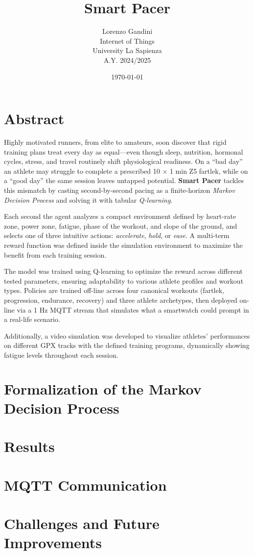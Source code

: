 \documentclass[a4paper,12pt]{article}
\title{Smart Pacer}
\author{Lorenzo Gandini \\ Internet of Things \\ University La Sapienza \\ A.Y. 2024/2025}
\date{\today}
\begin{document}
\maketitle

\newpage

\tableofcontents
\newpage

\section{Abstract}\label{abstract}
Highly motivated runners, from elite to amateurs, soon discover that rigid training plans treat every day as equal—even though sleep, nutrition, hormonal cycles, stress, and travel routinely shift physiological readiness. On a “bad day” an athlete may struggle to complete a prescribed 10 × 1 min Z5 fartlek, while on a “good day” the same session leaves untapped potential.  
\textbf{Smart Pacer} tackles this mismatch by casting second-by-second pacing as a finite-horizon \emph{Markov Decision Process} and solving it with tabular \emph{Q-learning}. 

Each second the agent analyzes a compact environment defined by heart-rate zone, power zone, fatigue, phase of the workout, and slope of the ground, and selects one of three intuitive actions: \emph{accelerate}, \emph{hold}, or \emph{ease}. A multi-term reward function was defined inside the simulation environment to maximize the benefit from each training session.

The model was trained using Q-learning to optimize the reward across different tested parameters, ensuring adaptability to various athlete profiles and workout types. Policies are trained off-line across four canonical workouts (fartlek, progression, endurance, recovery) and three athlete archetypes, then deployed on-line via a 1 Hz MQTT stream that simulates what a smartwatch could prompt in a real-life scenario.

Additionally, a video simulation was developed to visualize athletes' performances on different GPX tracks with the defined training programs, dynamically showing fatigue levels throughout each session.


\section{Formalization of the Markov Decision Process}\label{sec:methodology}


\section{Results}\label{sec:results}


\section{MQTT Communication}\label{sec:mqtt-communication}
  

\section{Challenges and Future Improvements}\label{sec:limitations}

\end{document}
